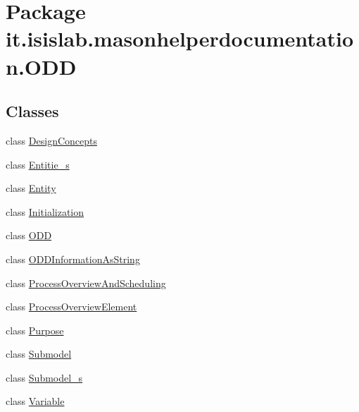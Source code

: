 \hypertarget{namespaceit_1_1isislab_1_1masonhelperdocumentation_1_1_o_d_d}{\section{Package it.\-isislab.\-masonhelperdocumentation.\-O\-D\-D}
\label{namespaceit_1_1isislab_1_1masonhelperdocumentation_1_1_o_d_d}
}
\subsection*{Classes}
\begin{DoxyCompactItemize}
\item 
class \hyperlink{classit_1_1isislab_1_1masonhelperdocumentation_1_1_o_d_d_1_1_design_concepts}{Design\-Concepts}
\item 
class \hyperlink{classit_1_1isislab_1_1masonhelperdocumentation_1_1_o_d_d_1_1_entitie__s}{Entitie\-\_\-s}
\item 
class \hyperlink{classit_1_1isislab_1_1masonhelperdocumentation_1_1_o_d_d_1_1_entity}{Entity}
\item 
class \hyperlink{classit_1_1isislab_1_1masonhelperdocumentation_1_1_o_d_d_1_1_initialization}{Initialization}
\item 
class \hyperlink{classit_1_1isislab_1_1masonhelperdocumentation_1_1_o_d_d_1_1_o_d_d}{O\-D\-D}
\item 
class \hyperlink{classit_1_1isislab_1_1masonhelperdocumentation_1_1_o_d_d_1_1_o_d_d_information_as_string}{O\-D\-D\-Information\-As\-String}
\item 
class \hyperlink{classit_1_1isislab_1_1masonhelperdocumentation_1_1_o_d_d_1_1_process_overview_and_scheduling}{Process\-Overview\-And\-Scheduling}
\item 
class \hyperlink{classit_1_1isislab_1_1masonhelperdocumentation_1_1_o_d_d_1_1_process_overview_element}{Process\-Overview\-Element}
\item 
class \hyperlink{classit_1_1isislab_1_1masonhelperdocumentation_1_1_o_d_d_1_1_purpose}{Purpose}
\item 
class \hyperlink{classit_1_1isislab_1_1masonhelperdocumentation_1_1_o_d_d_1_1_submodel}{Submodel}
\item 
class \hyperlink{classit_1_1isislab_1_1masonhelperdocumentation_1_1_o_d_d_1_1_submodel__s}{Submodel\-\_\-s}
\item 
class \hyperlink{classit_1_1isislab_1_1masonhelperdocumentation_1_1_o_d_d_1_1_variable}{Variable}
\end{DoxyCompactItemize}
